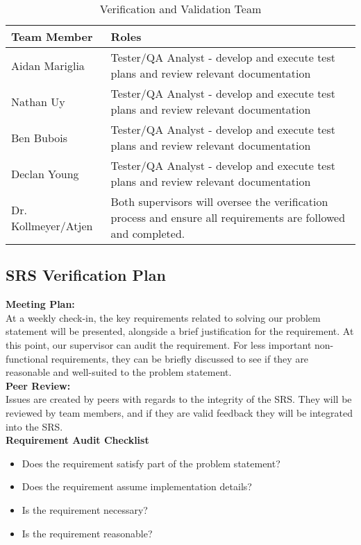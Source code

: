 \documentclass[12pt, titlepage]{article}
\begin{document}
\begin{table}[h]
\caption{Verification and Validation Team}
\begin{tabularx}{\textwidth}{|p{3cm}|X|}
\hline \textbf{Team Member} & \textbf{Roles}\\
\hline
Aidan Mariglia & Tester/QA Analyst - develop and execute test plans and review relevant documentation \\
\hline
Nathan Uy & Tester/QA Analyst - develop and execute test plans and review relevant documentation \\
\hline
Ben Bubois & Tester/QA Analyst - develop and execute test plans and review relevant documentation \\
\hline
Declan Young & Tester/QA Analyst - develop and execute test plans and review relevant documentation \\
\hline
Dr. Kollmeyer/Atjen & Both supervisors will oversee the verification process and ensure all requirements are followed and completed. \\
\hline
\end{tabularx}
\end{table}

\subsection{SRS Verification Plan}

\textbf{Meeting Plan:}\\
At a weekly check-in, the key requirements related to solving our problem statement will be presented, alongside a brief justification for the requirement. At this point, our supervisor can audit the requirement. For less important non-functional requirements, they can be briefly discussed to see if they are reasonable and well-suited to the problem statement.\\
\newline \textbf{Peer Review:}\\
Issues are created by peers with regards to the integrity of the SRS. They will be reviewed by team members, and if they are valid feedback they will be integrated into the SRS. \\
\newline \textbf{Requirement Audit Checklist}
\begin{itemize}
    \item Does the requirement satisfy part of the problem statement?
    \item Does the requirement assume implementation details?
    \item Is the requirement necessary?
    \item Is the requirement reasonable?
\end{itemize}
\end{document}
